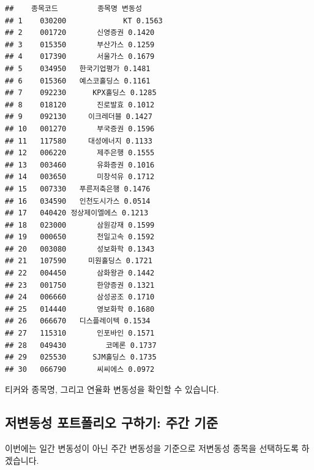 \documentclass[12pt,]{book}
\newenvironment{Shaded}{\begin{snugshade}}{\end{snugshade}}
\newcommand{\DecValTok}[1]{\textcolor[rgb]{0.00,0.00,0.81}{#1}}
\newcommand{\KeywordTok}[1]{\textcolor[rgb]{0.13,0.29,0.53}{\textbf{#1}}}
\newcommand{\NormalTok}[1]{#1}
\newcommand{\OperatorTok}[1]{\textcolor[rgb]{0.81,0.36,0.00}{\textbf{#1}}}
\newcommand{\OtherTok}[1]{\textcolor[rgb]{0.56,0.35,0.01}{#1}}
\newcommand{\StringTok}[1]{\textcolor[rgb]{0.31,0.60,0.02}{#1}}
\begin{document}
\begin{verbatim}
##    종목코드         종목명 변동성
## 1    030200             KT 0.1563
## 2    001720       신영증권 0.1420
## 3    015350       부산가스 0.1259
## 4    017390       서울가스 0.1679
## 5    034950   한국기업평가 0.1481
## 6    015360   예스코홀딩스 0.1161
## 7    092230      KPX홀딩스 0.1285
## 8    018120       진로발효 0.1012
## 9    092130     이크레더블 0.1427
## 10   001270       부국증권 0.1596
## 11   117580     대성에너지 0.1133
## 12   006220       제주은행 0.1555
## 13   003460       유화증권 0.1016
## 14   003650       미창석유 0.1712
## 15   007330   푸른저축은행 0.1476
## 16   034590   인천도시가스 0.0514
## 17   040420 정상제이엘에스 0.1213
## 18   023000       삼원강재 0.1599
## 19   000650       천일고속 0.1592
## 20   003080       성보화학 0.1343
## 21   107590     미원홀딩스 0.1721
## 22   004450       삼화왕관 0.1442
## 23   001750       한양증권 0.1321
## 24   006660       삼성공조 0.1710
## 25   014440       영보화학 0.1680
## 26   066670   디스플레이텍 0.1534
## 27   115310       인포바인 0.1571
## 28   049430         코메론 0.1737
## 29   025530      SJM홀딩스 0.1735
## 30   066790       씨씨에스 0.0972
\end{verbatim}

티커와 종목명, 그리고 연율화 변동성을 확인할 수 있습니다.

\hypertarget{section-51}{%
\subsection{저변동성 포트폴리오 구하기: 주간 기준}\label{section-51}}

이번에는 일간 변동성이 아닌 주간 변동성을 기준으로 저변동성 종목을 선택하도록 하겠습니다.

\begin{Shaded}
\end{Shaded}
\end{document}
